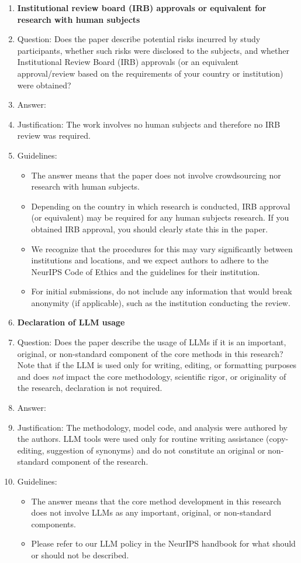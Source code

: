 \begin{enumerate}
\item {\bf Institutional review board (IRB) approvals or equivalent for research with human subjects}
    \item[] Question: Does the paper describe potential risks incurred by study participants, whether such risks were disclosed to the subjects, and whether Institutional Review Board (IRB) approvals (or an equivalent approval/review based on the requirements of your country or institution) were obtained?
    \item[] Answer: \answerNA{}
    \item[] Justification: The work involves no human subjects and therefore no IRB review was required.
    \item[] Guidelines:
    \begin{itemize}
        \item The answer \answerNA{} means that the paper does not involve crowdsourcing nor research with human subjects.
        \item Depending on the country in which research is conducted, IRB approval (or equivalent) may be required for any human subjects research. If you obtained IRB approval, you should clearly state this in the paper. 
        \item We recognize that the procedures for this may vary significantly between institutions and locations, and we expect authors to adhere to the NeurIPS Code of Ethics and the guidelines for their institution. 
        \item For initial submissions, do not include any information that would break anonymity (if applicable), such as the institution conducting the review.
    \end{itemize}

\item {\bf Declaration of LLM usage}
    \item[] Question: Does the paper describe the usage of LLMs if it is an important, original, or non-standard component of the core methods in this research? Note that if the LLM is used only for writing, editing, or formatting purposes and does \emph{not} impact the core methodology, scientific rigor, or originality of the research, declaration is not required.
    \item[] Answer: \answerNA{}
    \item[] Justification: The methodology, model code, and analysis were authored by the authors. LLM tools were used only for routine writing assistance (copy-editing, suggestion of synonyms) and do not constitute an original or non-standard component of the research.
    \item[] Guidelines:
    \begin{itemize}
        \item The answer \answerNA{} means that the core method development in this research does not involve LLMs as any important, original, or non-standard components.
        \item Please refer to our LLM policy in the NeurIPS handbook for what should or should not be described.
    \end{itemize}

\end{enumerate}
